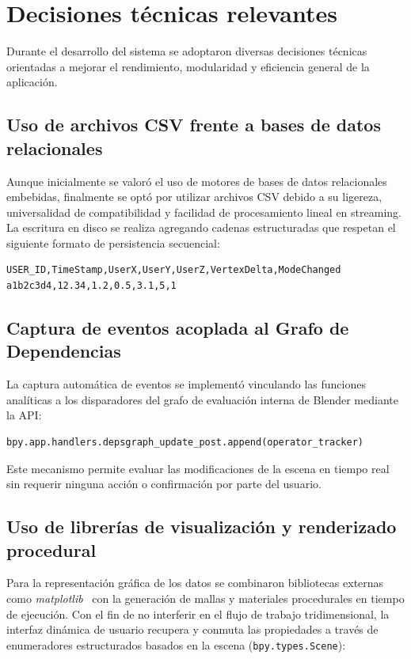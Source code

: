 \section{Decisiones técnicas relevantes}

Durante el desarrollo del sistema se adoptaron diversas decisiones técnicas orientadas a mejorar el rendimiento, modularidad y eficiencia general de la aplicación.

\subsection{Uso de archivos CSV frente a bases de datos relacionales}

Aunque inicialmente se valoró el uso de motores de bases de datos relacionales embebidas, finalmente se optó por utilizar archivos CSV debido a su ligereza, universalidad de compatibilidad y facilidad de procesamiento lineal en streaming. La escritura en disco se realiza agregando cadenas estructuradas que respetan el siguiente formato de persistencia secuencial:

\begin{verbatim}
USER_ID,TimeStamp,UserX,UserY,UserZ,VertexDelta,ModeChanged
a1b2c3d4,12.34,1.2,0.5,3.1,5,1
\end{verbatim}

\subsection{Captura de eventos acoplada al Grafo de Dependencias}

La captura automática de eventos se implementó vinculando las funciones analíticas a los disparadores del grafo de evaluación interna de Blender mediante la API:

\begin{verbatim}
bpy.app.handlers.depsgraph_update_post.append(operator_tracker)
\end{verbatim}

Este mecanismo permite evaluar las modificaciones de la escena en tiempo real sin requerir ninguna acción o confirmación por parte del usuario.

\subsection{Uso de librerías de visualización y renderizado procedural}

Para la representación gráfica de los datos se combinaron bibliotecas externas como \textit{matplotlib}~\cite{matplotlib} con la generación de mallas y materiales procedurales en tiempo de ejecución. Con el fin de no interferir en el flujo de trabajo tridimensional, la interfaz dinámica de usuario recupera y conmuta las propiedades a través de enumeradores estructurados basados en la escena (\texttt{bpy.types.Scene}):

